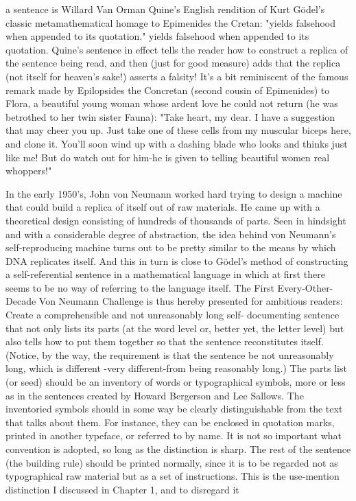 a sentence is Willard Van Orman Quine's English rendition of Kurt Gödel’s classic metamathematical homage to Epimenides the Cretan: 
"yields falsehood when appended to its quotation." yields falsehood when appended to its quotation. 
Quine's sentence in effect tells the reader how to construct a replica of the sentence being read, and then (just for good measure) adds that the replica (not itself for heaven's sake!) asserts a falsity! It's a bit reminiscent of the famous remark made by Epilopsides the Concretan (second cousin of Epimenides) to Flora, a beautiful young woman whose ardent love he could not return (he was betrothed to her twin sister Fauna): "Take heart, my dear. I have a suggestion that may cheer you up. Just take one of these cells from my muscular biceps here, and clone it. You'll soon wind up with a dashing blade who looks and thinks just like me! But do watch out for him-he is given to telling beautiful women real whoppers!" 
\separator

In the early 1950's, John von Neumann worked hard trying to design a machine that could build a replica of itself out of raw materials. He came up with a theoretical design consisting of hundreds of thousands of parts. Seen in hindsight and with a considerable degree of abstraction, the idea behind von Neumann's self-reproducing machine turns out to be pretty similar to the means by which DNA replicates itself. And this in turn is close to Gödel’s method of constructing a self-referential sentence in a mathematical language in which at first there seems to be no way of referring to the language itself. The First Every-Other-Decade Von Neumann Challenge is thus hereby presented for ambitious readers: Create a comprehensible and not unreasonably long self- documenting sentence that not only lists its parts (at the word level or, better yet, the letter level) but also tells how to put them together so that the sentence reconstitutes itself. (Notice, by the way, the requirement is that the sentence be not unreasonably long, which is different -very different-from being reasonably long.) The parts list (or seed) should be an inventory of words or typographical symbols, more or less as in the sentences created by Howard Bergerson and Lee Sallows. The inventoried symbols should in some way be clearly distinguishable from the text that talks about them. For instance, they can be enclosed in quotation marks, printed in another typeface, or referred to by name. It is not so important what convention is adopted, so long as the distinction is sharp. The rest of the sentence (the building rule) should be printed normally, since it is to be regarded not as typographical raw material but as a set of instructions. This is the use-mention distinction I discussed in Chapter 1, and to disregard it 




